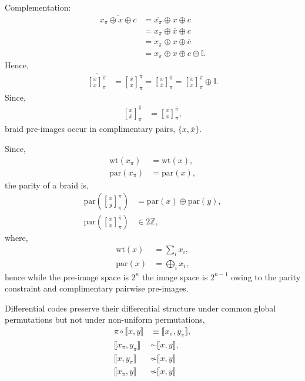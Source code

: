 \documentclass[twocolumn, aps, amsmath, amssymb, nofootinbib, superscriptaddress, longbibliography, doublefloatfix, table-of-contents, eqsecnum, rmp]{revtex4-2}
\def\diff#1#2{\llbracket #1,#2\rrbracket}
\newcommand{\stackbraid}[2]{{\genfrac{[}{]}{0pt}{}{{#1}}{{#2}}}^{\bar{\pi}}_{\pi}}
\begin{document}
Complementation:
\begin{align}
	\overline{x_\pi \oplus x \oplus c} &= \overline{x_\pi} \oplus x \oplus c \nonumber\\
	&= x_\pi \oplus \overline{x} \oplus c \nonumber\\
	&= x_\pi \oplus x \oplus \overline{c} \nonumber\\
	&= x_\pi \oplus x \oplus c \oplus \mathbb{I}.
\end{align}
Hence,
\begin{align}
	\overline{\stackbraid{x}{x}} &= \stackbraid{\overline{x}}{x} = \stackbraid{x}{\overline{x}} = \stackbraid{x}{x} \oplus \mathbb{I}.%
\end{align}
Since,
\begin{align}
	\stackbraid{\overline{x}}{\overline{x}} &= \stackbraid{x}{x},
\end{align}
braid pre-images occur in complimentary pairs, $\{x,\overline{x}\}$.

Since,
\begin{align}
	\mathrm{wt}(x_\pi) &= \mathrm{wt}(x),\nonumber\\
	\mathrm{par}(x_\pi) &= \mathrm{par}(x),
\end{align}
the parity of a braid is,
\begin{align}
	\mathrm{par}\left(\stackbraid{x}{y}\right) &= \mathrm{par}(x) \oplus \mathrm{par}(y),\nonumber\\
	\mathrm{par}\left(\stackbraid{x}{x}\right) &\in 2\mathbb{Z},
\end{align}
where,
\begin{align}
	\mathrm{wt}(x) &= \sum_i x_i,\nonumber\\
	\mathrm{par}(x) &= \bigoplus_i x_i,	
\end{align}
hence while the pre-image space is $2^n$ the image space is $2^{n-1}$ owing to the parity constraint and complimentary pairwise pre-images.

Differential codes preserve their differential structure under common global permutations but not under non-uniform permutations,
\begin{align}
	\pi\circ \diff{x}{y}	 &\equiv \diff{x_\pi}{y_\pi},\nonumber\\
 	\diff{x_\pi}{y_\pi} &\sim \diff{x}{y},\nonumber\\
	\diff{x}{y_\pi} &\not\sim \diff{x}{y} \nonumber\\
	\diff{x_\pi}{y} &\not\sim \diff{x}{y}
\end{align}
\end{document}
